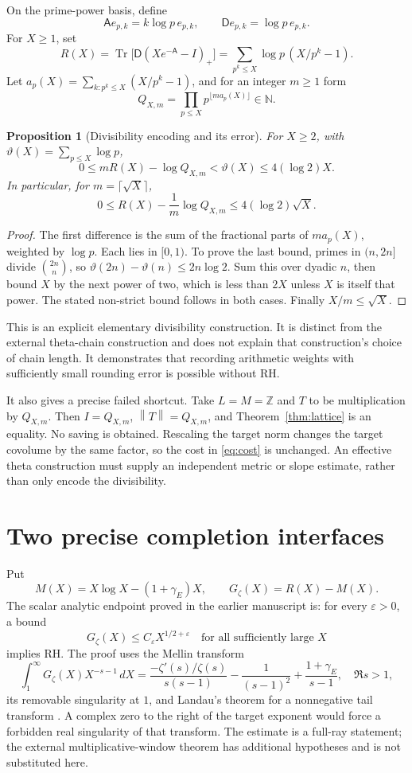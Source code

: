 \documentclass[11pt,letterpaper]{article}
\newtheorem{proposition}[theorem]{Proposition}
\theoremstyle{definition}
\theoremstyle{remark}
\newcommand{\Z}{\mathbb Z}
\newcommand{\N}{\mathbb N}
\newcommand{\tr}{\operatorname{Tr}}
\newcommand{\norm}[1]{\left\lVert#1\right\rVert}
\numberwithin{equation}{section}
\begin{document}
On the prime-power basis, define
\[
 \mathsf A e_{p,k}=k\log p\,e_{p,k},\qquad
 \mathsf D e_{p,k}=\log p\,e_{p,k}.
\]
For $X\ge1$, set
\[
 R(X)=\tr\bigl[\mathsf D(Xe^{-\mathsf A}-I)_+\bigr]
 =\sum_{p^k\le X}\log p\,(X/p^k-1).
\]
Let $a_p(X)=\sum_{k:p^k\le X}(X/p^k-1)$, and for an integer $m\ge1$ form
\[
 Q_{X,m}=\prod_{p\le X}p^{\lfloor ma_p(X)\rfloor}\in\N.
\]

\begin{proposition}[Divisibility encoding and its error]\label{prop:round}
For $X\ge2$, with $\vartheta(X)=\sum_{p\le X}\log p$,
\[
 0\le mR(X)-\log Q_{X,m}<\vartheta(X)\le4(\log2)X.
\]
In particular, for $m=\lceil\sqrt X\rceil$,
\[
 0\le R(X)-\frac1m\log Q_{X,m}\le4(\log2)\sqrt X.
\]
\end{proposition}
\begin{proof}
The first difference is the sum of the fractional parts of $ma_p(X)$, weighted by $\log p$. Each lies in $[0,1)$. To prove the last bound, primes in $(n,2n]$ divide $\binom{2n}{n}$, so
$\vartheta(2n)-\vartheta(n)\le2n\log2$.
Sum this over dyadic $n$, then bound $X$ by the next power of two, which is less than $2X$ unless $X$ is itself that power. The stated non-strict bound follows in both cases. Finally $X/m\le\sqrt X$.
\end{proof}

This is an explicit elementary divisibility construction. It is distinct from the external theta-chain construction and does not explain that construction's choice of chain length. It demonstrates that recording arithmetic weights with sufficiently small rounding error is possible without RH.

It also gives a precise failed shortcut. Take $L=M=\Z$ and $T$ to be multiplication by $Q_{X,m}$. Then $I=Q_{X,m}$, $\norm T=Q_{X,m}$, and Theorem~\ref{thm:lattice} is an equality. No saving is obtained. Rescaling the target norm changes the target covolume by the same factor, so the cost in \eqref{eq:cost} is unchanged. An effective theta construction must supply an independent metric or slope estimate, rather than only encode the divisibility.

\section{Two precise completion interfaces}

Put
\[
 M(X)=X\log X-(1+\gamma_E)X,\qquad G_\zeta(X)=R(X)-M(X).
\]
The scalar analytic endpoint proved in the earlier manuscript is: for every $\varepsilon>0$, a bound
\[
 G_\zeta(X)\le C_\varepsilon X^{1/2+\varepsilon}
 \quad\text{for all sufficiently large }X
\]
implies RH. The proof uses the Mellin transform
\[
 \int_1^\infty G_\zeta(X)X^{-s-1}\,dX
 =\frac{-\zeta'(s)/\zeta(s)}{s(s-1)}
 -\frac1{(s-1)^2}+\frac{1+\gamma_E}{s-1},\quad\Re s>1,
\]
its removable singularity at $1$, and Landau's theorem for a nonnegative tail transform \cite{project}. A complex zero to the right of the target exponent would force a forbidden real singularity of that transform. The estimate is a full-ray statement; the external multiplicative-window theorem has additional hypotheses and is not substituted here.
\end{document}
